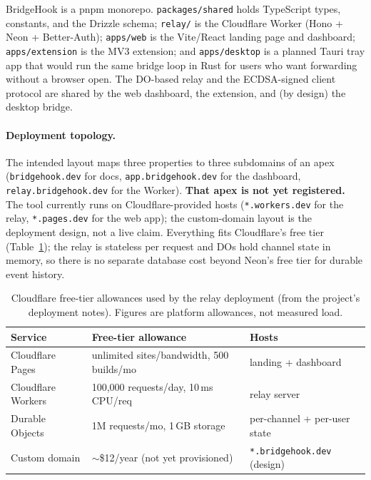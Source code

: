 \documentclass[11pt]{article}
\begin{document}
BridgeHook is a pnpm monorepo. \texttt{packages/shared} holds TypeScript types,
constants, and the Drizzle schema; \texttt{relay/} is the Cloudflare Worker
(Hono + Neon + Better-Auth); \texttt{apps/web} is the Vite/React landing page
and dashboard; \texttt{apps/extension} is the MV3 extension; and
\texttt{apps/desktop} is a planned Tauri tray app that would run the same bridge
loop in Rust for users who want forwarding without a browser open. The DO-based
relay and the ECDSA-signed client protocol are shared by the web dashboard, the
extension, and (by design) the desktop bridge.

\paragraph{Deployment topology.} The intended layout maps three properties to
three subdomains of an apex (\texttt{bridgehook.dev} for docs,
\texttt{app.bridgehook.dev} for the dashboard, \texttt{relay.bridgehook.dev}
for the Worker). \textbf{That apex is not yet registered.} The tool currently
runs on Cloudflare-provided hosts (\texttt{*.workers.dev} for the relay,
\texttt{*.pages.dev} for the web app); the custom-domain layout is the
deployment design, not a live claim. Everything fits Cloudflare's free tier
(Table~\ref{tab:cost}); the relay is stateless per request and DOs hold channel
state in memory, so there is no separate database cost beyond Neon's free tier
for durable event history.

\begin{table}[t]
\centering
\caption{Cloudflare free-tier allowances used by the relay deployment (from the
project's deployment notes). Figures are platform allowances, not measured
load.}
\label{tab:cost}
\begin{tabular}{lll}
\toprule
Service & Free-tier allowance & Hosts \\
\midrule
Cloudflare Pages   & unlimited sites/bandwidth, 500 builds/mo & landing + dashboard \\
Cloudflare Workers & 100{,}000 requests/day, 10\,ms CPU/req   & relay server \\
Durable Objects    & 1M requests/mo, 1\,GB storage            & per-channel + per-user state \\
Custom domain      & $\sim$\$12/year (not yet provisioned)    & \texttt{*.bridgehook.dev} (design) \\
\bottomrule
\end{tabular}
\end{table}
\end{document}
